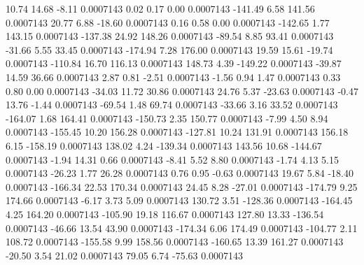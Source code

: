        10.74       14.68       -8.11     0.0007143
        0.02        0.17        0.00     0.0007143
     -141.49        6.58      141.56     0.0007143
       20.77        6.88      -18.60     0.0007143
        0.16        0.58        0.00     0.0007143
     -142.65        1.77      143.15     0.0007143
     -137.38       24.92      148.26     0.0007143
      -89.54        8.85       93.41     0.0007143
      -31.66        5.55       33.45     0.0007143
     -174.94        7.28      176.00     0.0007143
       19.59       15.61      -19.74     0.0007143
     -110.84       16.70      116.13     0.0007143
      148.73        4.39     -149.22     0.0007143
      -39.87       14.59       36.66     0.0007143
        2.87        0.81       -2.51     0.0007143
       -1.56        0.94        1.47     0.0007143
        0.33        0.80        0.00     0.0007143
      -34.03       11.72       30.86     0.0007143
       24.76        5.37      -23.63     0.0007143
       -0.47       13.76       -1.44     0.0007143
      -69.54        1.48       69.74     0.0007143
      -33.66        3.16       33.52     0.0007143
     -164.07        1.68      164.41     0.0007143
     -150.73        2.35      150.77     0.0007143
       -7.99        4.50        8.94     0.0007143
     -155.45       10.20      156.28     0.0007143
     -127.81       10.24      131.91     0.0007143
      156.18        6.15     -158.19     0.0007143
      138.02        4.24     -139.34     0.0007143
      143.56       10.68     -144.67     0.0007143
       -1.94       14.31        0.66     0.0007143
       -8.41        5.52        8.80     0.0007143
       -1.74        4.13        5.15     0.0007143
      -26.23        1.77       26.28     0.0007143
        0.76        0.95       -0.63     0.0007143
       19.67        5.84      -18.40     0.0007143
     -166.34       22.53      170.34     0.0007143
       24.45        8.28      -27.01     0.0007143
     -174.79        9.25      174.66     0.0007143
       -6.17        3.73        5.09     0.0007143
      130.72        3.51     -128.36     0.0007143
     -164.45        4.25      164.20     0.0007143
     -105.90       19.18      116.67     0.0007143
      127.80       13.33     -136.54     0.0007143
      -46.66       13.54       43.90     0.0007143
     -174.34        6.06      174.49     0.0007143
     -104.77        2.11      108.72     0.0007143
     -155.58        9.99      158.56     0.0007143
     -160.65       13.39      161.27     0.0007143
      -20.50        3.54       21.02     0.0007143
       79.05        6.74      -75.63     0.0007143
